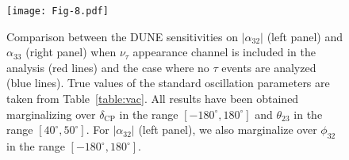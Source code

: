 \documentclass[11pt,a4paper]{article}
\newcommand{\capdef}{}
\newcommand{\mycaption}[2][\capdef]{\renewcommand{\capdef}{#2}
	\caption[#1]{{\footnotesize #2}}}
\begin{document}
\begin{figure}[h!]
\centering
\texttt{[image: Fig-8.pdf]}
\mycaption{Comparison between the DUNE sensitivities on $|\alpha_{32}|$ (left panel) and $\alpha_{33}$ (right panel) when $\nu_\tau$ appearance channel is included in the analysis (red lines) and the case where no $\tau$ events are analyzed (blue lines). True values of the standard oscillation parameters are taken from Table~\ref{table:vac}. All results have been obtained marginalizing over $\delta_{\mathrm{CP}}$ in the range $[-180^{\circ}, 180^{\circ}]$ and $\theta_{23}$ in the range $[40^{\circ}, 50^{\circ}]$. For $|\alpha_{32}|$ (left panel), we also marginalize over $\phi_{32}$ in the range $[-180^{\circ}, 180^{\circ}]$. }
\label{fig:tau}
\end{figure}
\end{document}
